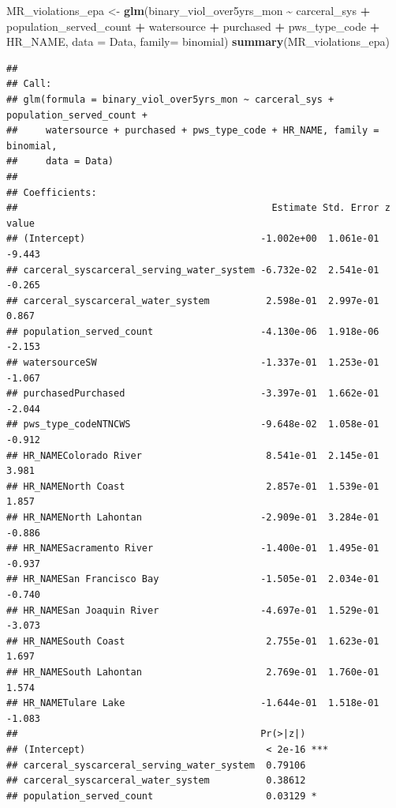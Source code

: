 \documentclass[
]{article}
\newenvironment{Shaded}{\begin{snugshade}}{\end{snugshade}}
\newcommand{\AttributeTok}[1]{\textcolor[rgb]{0.13,0.29,0.53}{#1}}
\newcommand{\FunctionTok}[1]{\textcolor[rgb]{0.13,0.29,0.53}{\textbf{#1}}}
\newcommand{\NormalTok}[1]{#1}
\newcommand{\OtherTok}[1]{\textcolor[rgb]{0.56,0.35,0.01}{#1}}
\newcommand{\SpecialCharTok}[1]{\textcolor[rgb]{0.81,0.36,0.00}{\textbf{#1}}}
\begin{document}
\begin{Shaded}
\begin{Highlighting}[]
\NormalTok{MR\_violations\_epa }\OtherTok{\textless{}{-}} \FunctionTok{glm}\NormalTok{(binary\_viol\_over5yrs\_mon }\SpecialCharTok{\textasciitilde{}}\NormalTok{ carceral\_sys }\SpecialCharTok{+}\NormalTok{ population\_served\_count }\SpecialCharTok{+}\NormalTok{ watersource }\SpecialCharTok{+}\NormalTok{ purchased }\SpecialCharTok{+}\NormalTok{ pws\_type\_code }\SpecialCharTok{+}\NormalTok{ HR\_NAME, }\AttributeTok{data =}\NormalTok{ Data, }\AttributeTok{family=}\NormalTok{ binomial)}
\FunctionTok{summary}\NormalTok{(MR\_violations\_epa)}
\end{Highlighting}
\end{Shaded}

\begin{verbatim}
## 
## Call:
## glm(formula = binary_viol_over5yrs_mon ~ carceral_sys + population_served_count + 
##     watersource + purchased + pws_type_code + HR_NAME, family = binomial, 
##     data = Data)
## 
## Coefficients:
##                                             Estimate Std. Error z value
## (Intercept)                               -1.002e+00  1.061e-01  -9.443
## carceral_syscarceral_serving_water_system -6.732e-02  2.541e-01  -0.265
## carceral_syscarceral_water_system          2.598e-01  2.997e-01   0.867
## population_served_count                   -4.130e-06  1.918e-06  -2.153
## watersourceSW                             -1.337e-01  1.253e-01  -1.067
## purchasedPurchased                        -3.397e-01  1.662e-01  -2.044
## pws_type_codeNTNCWS                       -9.648e-02  1.058e-01  -0.912
## HR_NAMEColorado River                      8.541e-01  2.145e-01   3.981
## HR_NAMENorth Coast                         2.857e-01  1.539e-01   1.857
## HR_NAMENorth Lahontan                     -2.909e-01  3.284e-01  -0.886
## HR_NAMESacramento River                   -1.400e-01  1.495e-01  -0.937
## HR_NAMESan Francisco Bay                  -1.505e-01  2.034e-01  -0.740
## HR_NAMESan Joaquin River                  -4.697e-01  1.529e-01  -3.073
## HR_NAMESouth Coast                         2.755e-01  1.623e-01   1.697
## HR_NAMESouth Lahontan                      2.769e-01  1.760e-01   1.574
## HR_NAMETulare Lake                        -1.644e-01  1.518e-01  -1.083
##                                           Pr(>|z|)    
## (Intercept)                                < 2e-16 ***
## carceral_syscarceral_serving_water_system  0.79106    
## carceral_syscarceral_water_system          0.38612    
## population_served_count                    0.03129 *  

\end{verbatim}
\end{document}

